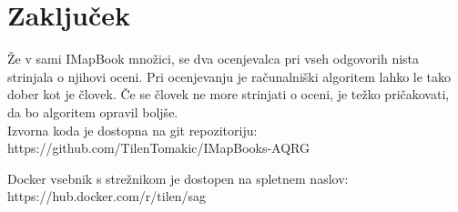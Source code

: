 \documentclass[journal]{IEEEtran}
\begin{document}

\section{Zaključek}
Že v sami IMapBook množici, se dva ocenjevalca pri vseh odgovorih nista strinjala o njihovi oceni. Pri ocenjevanju je računalniški algoritem lahko le tako dober kot je človek. Če se človek ne more strinjati o oceni, je težko pričakovati, da bo algoritem opravil boljše.\\

Izvorna koda je dostopna na git repozitoriju: https://github.com/TilenTomakic/IMapBooks-AQRG

Docker vsebnik s strežnikom je dostopen na spletnem naslov:
https://hub.docker.com/r/tilen/sag

\ifCLASSOPTIONcaptionsoff
  \newpage
\fi



\end{document}
